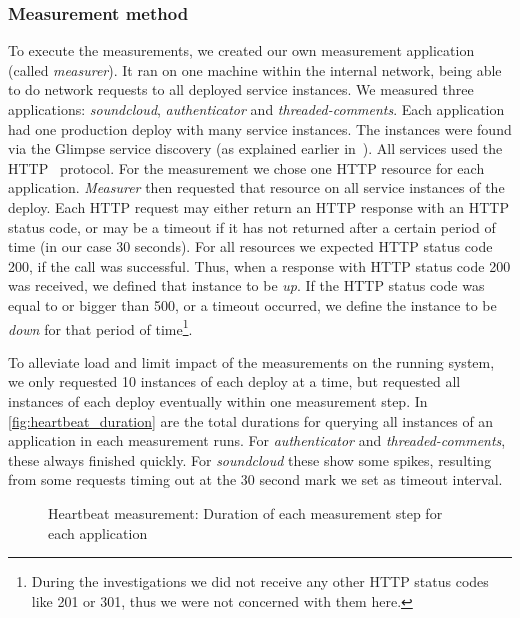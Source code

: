 \subsubsection{Measurement method}

To execute the measurements, we created our own measurement application (called \emph{measurer}). It ran on one machine within the internal network, being able to do network requests to all deployed service instances. We measured three applications: \emph{soundcloud}, \emph{authenticator} and \emph{threaded-comments}. Each application had one production deploy with many service instances. The instances were found via the Glimpse service discovery (as explained earlier in~). All services used the HTTP~\cite{rfc2616} protocol. For the measurement we chose one HTTP resource for each application. \emph{Measurer} then requested that resource on all service instances of the deploy. Each HTTP request may either return an HTTP response with an HTTP status code, or may be a timeout if it has not returned after a certain period of time (in our case 30 seconds). For all resources we expected HTTP status code 200, if the call was successful. Thus, when a response with HTTP status code 200 was received, we defined that instance to be \emph{up}. If the HTTP status code was equal to or bigger than 500, or a timeout occurred, we define the instance to be \emph{down} for that period of time\footnote{During the investigations we did not receive any other HTTP status codes like 201 or 301, thus we were not concerned with them here.}.

To alleviate load and limit impact of the measurements on the running system, we only requested 10 instances of each deploy at a time, but requested all instances of each deploy eventually within one measurement step. In \autoref{fig:heartbeat_duration} are the total durations for querying all instances of an application in each measurement runs. For \emph{authenticator} and \emph{threaded-comments}, these always finished quickly. For \emph{soundcloud} these show some spikes, resulting from some requests timing out at the 30 second mark we set as timeout interval.

\begin{figure}[ht]
  \caption{Heartbeat measurement: Duration of each measurement step for each application}
  \label{fig:heartbeat_duration}
\end{figure}

